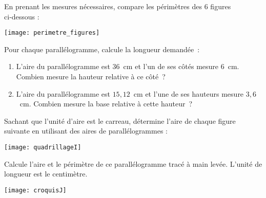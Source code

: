 
\vspace*{2cm}

\phantom{Pour sauter une ligne}

\newpage



\begin{exercice}
En prenant les mesures nécessaires, compare les périmètres des 6 figures ci‑dessous :

\begin{center} \texttt{[image: perimetre\_figures]} \end{center}
\end{exercice}


\begin{exercice}
Pour chaque parallélogramme, calcule la longueur demandée :
\begin{enumerate}
 \item L'aire du parallélogramme est 36 cm et l'un de ses côtés mesure 6 cm. Combien mesure la hauteur relative à ce côté ?
 \item L'aire du parallélogramme est $15,12$ cm et l'une de ses hauteurs mesure $3,6$ cm. Combien mesure la base relative à cette hauteur ?
 \end{enumerate}
\end{exercice}


\begin{exercice}
Sachant que l'unité d'aire est le carreau, détermine l'aire de chaque figure suivante en utilisant des aires de parallélogrammes :

\begin{center} \texttt{[image: quadrillageI]} \end{center}
\end{exercice}


\begin{exercice}
\begin{minipage}[c]{0.48\linewidth}
Calcule l'aire et le périmètre de ce parallélogramme tracé à main levée. L'unité de longueur est le centimètre.
 \end{minipage} \hfill%
 \begin{minipage}[c]{0.48\linewidth}
\begin{center} \texttt{[image: croquisJ]} \end{center} 
  \end{minipage} \\
\end{exercice}


